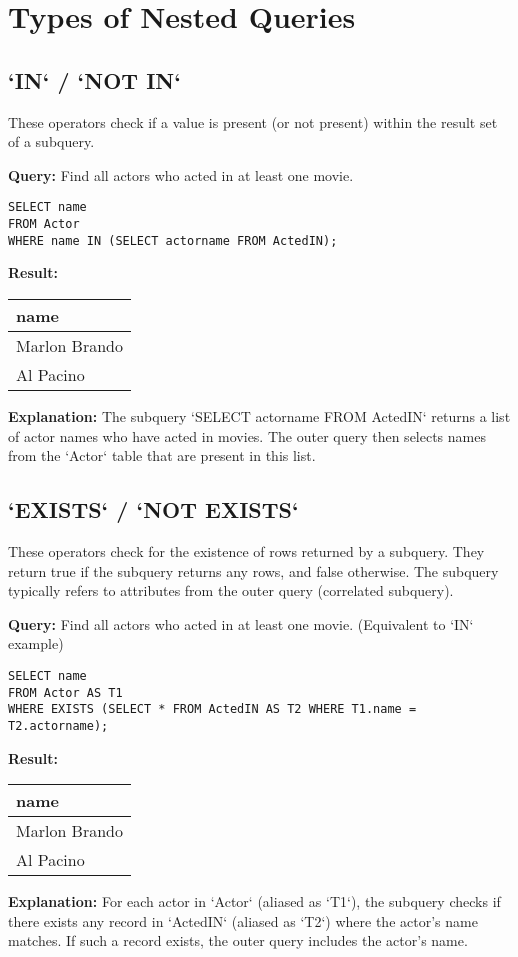 \documentclass{article}
\begin{document}
\section*{Types of Nested Queries}

\subsection*{`IN` / `NOT IN` }
These operators check if a value is present (or not present) within the result set of a subquery.

\textbf{Query:} Find all actors who acted in at least one movie. 
\begin{lstlisting}
SELECT name
FROM Actor
WHERE name IN (SELECT actorname FROM ActedIN);
\end{lstlisting}
\textbf{Result:} 
\begin{tabular}{|l|}
    \hline
    \textbf{name} \\
    \hline
    Marlon Brando \\
    Al Pacino \\
    \hline
\end{tabular}
\textbf{Explanation:} The subquery `SELECT actorname FROM ActedIN` returns a list of actor names who have acted in movies. The outer query then selects names from the `Actor` table that are present in this list.

\subsection*{`EXISTS` / `NOT EXISTS` }
These operators check for the existence of rows returned by a subquery. They return true if the subquery returns any rows, and false otherwise. The subquery typically refers to attributes from the outer query (correlated subquery).

\textbf{Query:} Find all actors who acted in at least one movie. (Equivalent to `IN` example) 
\begin{lstlisting}
SELECT name
FROM Actor AS T1
WHERE EXISTS (SELECT * FROM ActedIN AS T2 WHERE T1.name = T2.actorname);
\end{lstlisting}
\textbf{Result:} 
\begin{tabular}{|l|}
    \hline
    \textbf{name} \\
    \hline
    Marlon Brando \\
    Al Pacino \\
    \hline
\end{tabular}
\textbf{Explanation:} For each actor in `Actor` (aliased as `T1`), the subquery checks if there exists any record in `ActedIN` (aliased as `T2`) where the actor's name matches. If such a record exists, the outer query includes the actor's name.
\end{document}
